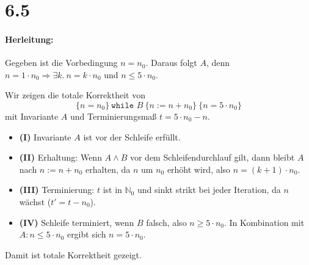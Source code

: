 \documentclass[a4paper,12pt]{article}
\begin{document}
\section*{6.5}

\paragraph{Herleitung:} Gegeben ist die Vorbedingung $n = n_0$. Daraus folgt $A$, denn $n = 1 \cdot n_0 \Rightarrow \exists k.\ n = k \cdot n_0$ und $n \leq 5 \cdot n_0$.

Wir zeigen die totale Korrektheit von 
\[
\{ n = n_0 \} \ \texttt{while } B \ \{ n := n + n_0 \} \ \{ n = 5 \cdot n_0 \}
\]
mit Invariante $A$ und Terminierungsmaß $t = 5 \cdot n_0 - n$.

\begin{itemize}
  \item \textbf{(I)} Invariante $A$ ist vor der Schleife erfüllt.
  \item \textbf{(II)} Erhaltung: Wenn $A \land B$ vor dem Schleifendurchlauf gilt, dann bleibt $A$ nach $n := n + n_0$ erhalten, da $n$ um $n_0$ erhöht wird, also $n = (k+1) \cdot n_0$.
  \item \textbf{(III)} Terminierung: $t$ ist in $\mathbb{N}_0$ und sinkt strikt bei jeder Iteration, da $n$ wächst ($t' = t - n_0$).
  \item \textbf{(IV)} Schleife terminiert, wenn $B$ falsch, also $n \geq 5 \cdot n_0$. In Kombination mit $A: n \leq 5 \cdot n_0$ ergibt sich $n = 5 \cdot n_0$.
\end{itemize}

Damit ist totale Korrektheit gezeigt.
\end{document}
